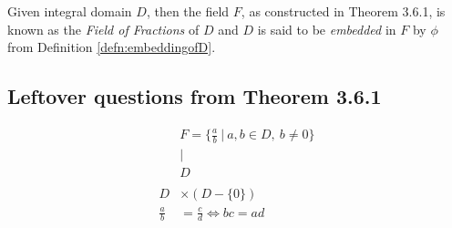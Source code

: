 \begin{definition}
Given integral domain $D$, then the field $F$, as constructed in Theorem 3.6.1, is known as the \textit{Field of Fractions} of $D$ and $D$ is said to be \textit{embedded} in $F$ by $\phi$ from Definition \ref{defn:embeddingofD}.
\end{definition}
\newpage
\subsection{Leftover questions from Theorem 3.6.1} 

\begin{align}
    &F = \{\frac{a}{b} \ | \ a,b\in D, \  b\neq 0\} \nonumber \\
    &\vert \nonumber \\ 
    &D \nonumber \\
    & \nonumber \\
    D &\times (D-\{ 0 \}) \nonumber \\
    \frac{a}{b} &= \frac{c}{d} \iff bc=ad \nonumber
\end{align}

